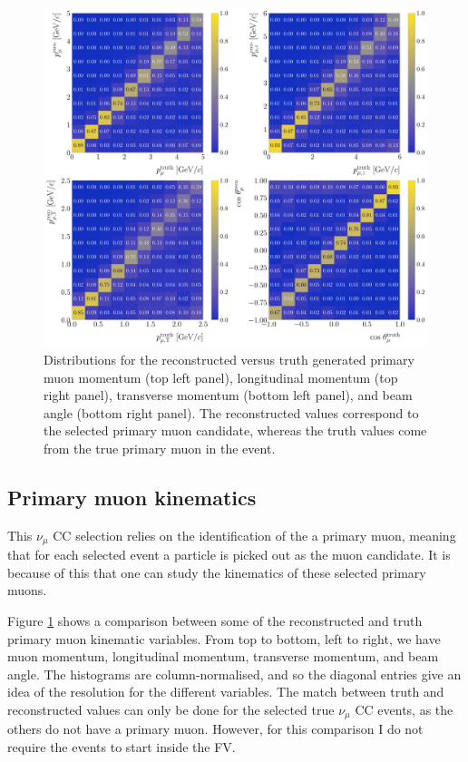 \begin{figure}[t]
    \centering
    \includegraphics[width=.99\linewidth]{Images/GAr_selection/numuCC_muon_kinematic_comp.pdf}
    \caption[Distributions for the reconstructed versus truth primary muon momentum, longitudinal momentum, transverse momentum, and angle.]{Distributions for the reconstructed versus truth generated primary muon momentum (top left panel), longitudinal momentum (top right panel), transverse momentum (bottom left panel), and beam angle (bottom right panel). The reconstructed values correspond to the selected primary muon candidate, whereas the truth values come from the true primary muon in the event.}
    \label{fig:numuCC_muon_kinematic_comp}
\end{figure}

\subsection{Primary muon kinematics}

This $\nu_{\mu}$ CC selection relies on the identification of the a primary muon, meaning that for each selected event a particle is picked out as the muon candidate. It is because of this that one can study the kinematics of these selected primary muons.

Figure \ref{fig:numuCC_muon_kinematic_comp} shows a comparison between some of the reconstructed and truth primary muon kinematic variables. From top to bottom, left to right, we have muon momentum, longitudinal momentum, transverse momentum, and beam angle. The histograms are column-normalised, and so the diagonal entries give an idea of the resolution for the different variables. The match between truth and reconstructed values can only be done for the selected true $\nu_{\mu}$ CC events, as the others do not have a primary muon. However, for this comparison I do not require the events to start inside the FV.

